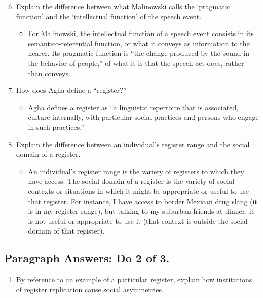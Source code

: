 \documentclass[doc,12pt]{apa6}
\providecommand{\tightlist}{%
  \setlength{\itemsep}{0pt}\setlength{\parskip}{0pt}}
\begin{document}
\begin{enumerate}
\setcounter{enumi}{5}
\item
  Explain the difference between what Malinowski calls the `pragmatic
  function' and the `intellectual function' of the speech event.

  \begin{itemize}
  \tightlist
  \item
    For Malinowski, the intellectual function of a speech event consists
    in its semantico-referential function, or what it conveys as
    information to the hearer. Its pragmatic function is ``the change
    produced by the sound in the behavior of people,'' of what it is
    that the speech act does, rather than conveys.
  \end{itemize}
\item
  How does Agha define a ``register?''

  \begin{itemize}
  \tightlist
  \item
    Agha defines a register as ``a linguistic repertoire that is
    associated, culture-internally, with particular social practices and
    persons who engage in such practices.''
  \end{itemize}
\item
  Explain the difference between an individual's register range and the
  social domain of a register.

  \begin{itemize}
  \tightlist
  \item
    An individual's register range is the variety of registers to which
    they have access. The social domain of a register is the variety of
    social contexts or situations in which it might be appropriate or
    useful to use that register. For instance, I have access to border
    Mexican drug slang (it is in my register range), but talking to my
    suburban friends at dinner, it is not useful or appropriate to use
    it (that context is outside the social domain of that register).
  \end{itemize}
\end{enumerate}

\subsection{Paragraph Answers: Do 2 of
3.}\label{paragraph-answers-do-2-of-3.}

\begin{enumerate}
\def\labelenumi{\arabic{enumi}.}
\setcounter{enumi}{9}
\tightlist
\item
  By reference to an example of a particular register, explain how
  institutions of register replication cause social asymmetries.
\end{enumerate}
\end{document}
